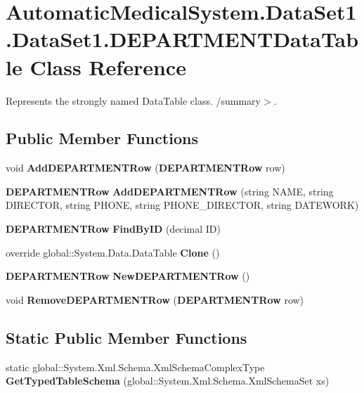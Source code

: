 \section{AutomaticMedicalSystem.DataSet1.DataSet1.DEPARTMENTDataTable Class Reference}
\label{class_automatic_medical_system_1_1_data_set1_1_1_d_e_p_a_r_t_m_e_n_t_data_table}
Represents the strongly named DataTable class. /summary$>$.  


\subsection*{Public Member Functions}
\begin{CompactItemize}
\item 
void \textbf{AddDEPARTMENTRow} ({\bf DEPARTMENTRow} row)\label{class_automatic_medical_system_1_1_data_set1_1_1_d_e_p_a_r_t_m_e_n_t_data_table_7d89eac581a21cf64aac99b84f6e5708}

\item 
{\bf DEPARTMENTRow} \textbf{AddDEPARTMENTRow} (string NAME, string DIRECTOR, string PHONE, string PHONE\_\-DIRECTOR, string DATEWORK)\label{class_automatic_medical_system_1_1_data_set1_1_1_d_e_p_a_r_t_m_e_n_t_data_table_8ea594f244091673886e7b9d121a7aae}

\item 
{\bf DEPARTMENTRow} \textbf{FindByID} (decimal ID)\label{class_automatic_medical_system_1_1_data_set1_1_1_d_e_p_a_r_t_m_e_n_t_data_table_34394bf0f7b757fb41ae2e88c5f436a0}

\item 
override global::System.Data.DataTable \textbf{Clone} ()\label{class_automatic_medical_system_1_1_data_set1_1_1_d_e_p_a_r_t_m_e_n_t_data_table_f1516cebaf4f3c2a9369a32a230c9ba4}

\item 
{\bf DEPARTMENTRow} \textbf{NewDEPARTMENTRow} ()\label{class_automatic_medical_system_1_1_data_set1_1_1_d_e_p_a_r_t_m_e_n_t_data_table_e88a7c902a930cd3ab521fcde24c1668}

\item 
void \textbf{RemoveDEPARTMENTRow} ({\bf DEPARTMENTRow} row)\label{class_automatic_medical_system_1_1_data_set1_1_1_d_e_p_a_r_t_m_e_n_t_data_table_dc1a1792de3c6226b7882c44fde5c674}

\end{CompactItemize}
\subsection*{Static Public Member Functions}
\begin{CompactItemize}
\item 
static global::System.Xml.Schema.XmlSchemaComplexType \textbf{GetTypedTableSchema} (global::System.Xml.Schema.XmlSchemaSet xs)\label{class_automatic_medical_system_1_1_data_set1_1_1_d_e_p_a_r_t_m_e_n_t_data_table_d6ca18f7c11bb098a23aa5433d04a710}

\end{CompactItemize}
